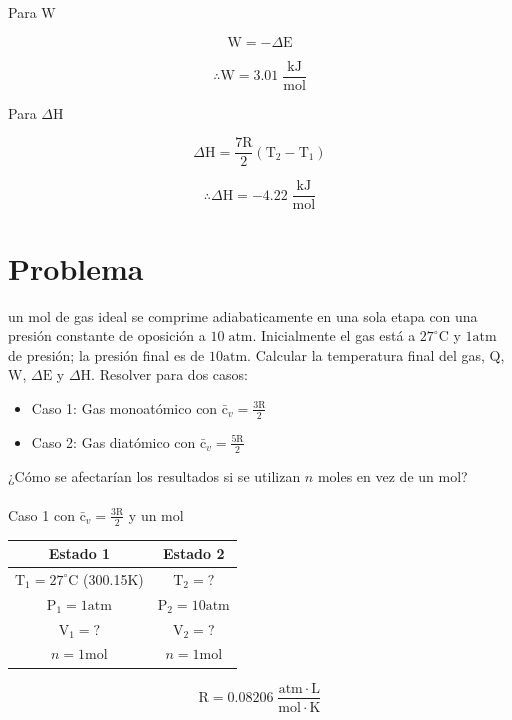 \documentclass[12pt]{article}
\begin{document}
Para $\mathrm{W}$

\begin{displaymath}
	\mathrm{W}=-\Delta\mathrm{E}
\end{displaymath}

\begin{displaymath}
	\therefore\mathrm{W}=3.01\;\frac{\mathrm{kJ}}{\mathrm{mol}}
\end{displaymath}

Para $\Delta\mathrm{H}$

\begin{displaymath}
	\Delta\mathrm{H}=\frac{7\mathrm{R}}{2}(\mathrm{T}_2-\mathrm{T}_1)
\end{displaymath}

\begin{displaymath}
	\therefore\Delta\mathrm{H}=-4.22\;\frac{\mathrm{kJ}}{\mathrm{mol}}
\end{displaymath}
\newpage

\section*{Problema}

un mol de gas ideal se comprime adiabaticamente en una sola etapa con una presión constante de oposición a $10\;\mathrm{atm}$. Inicialmente el gas está a $27^{\circ}\mathrm{C}$ y $1\mathrm{atm}$ de presión; la presión final es de $10\mathrm{atm}$. Calcular la temperatura final del gas, $\mathrm{Q}$, $\mathrm{W}$, $\Delta\mathrm{E}$ y $\Delta\mathrm{H}$. Resolver para dos casos:
\begin{itemize}
	\item Caso 1: Gas monoatómico con $\mathrm{\bar{c}}_v=\frac{3\mathrm{R}}{2}$
	
	\item Caso 2: Gas diatómico con $\mathrm{\bar{c}}_v=\frac{5\mathrm{R}}{2}$
\end{itemize}

¿Cómo se afectarían los resultados si se utilizan $n$ moles en vez de un mol?\\
\\

Caso 1 con $\mathrm{\bar{c}}_v=\frac{3\mathrm{R}}{2}$ y un mol

\begin{center}
	\begin{tabular}{| c | c |}
		\hline
		Estado 1 &    Estado 2 \\ \hline
		$\mathrm{T}_1=27^{\circ}\mathrm{C}$\; (300.15$\mathrm{K}$) &    $\mathrm{T}_2=?$ \\
		$\mathrm{P}_1=1\mathrm{atm}$ &    $\mathrm{P}_2=10\mathrm{atm}$ \\
		$\mathrm{V}_1=?$ &    $\mathrm{V}_2=?$\\
		$n=1\mathrm{mol}$&    $n=1\mathrm{mol}$\\ \hline
	\end{tabular}

\begin{displaymath}
	\mathrm{R}=0.08206\; \frac{\mathrm{atm}\cdot\mathrm{L}}{\mathrm{mol}\cdot\mathrm{K}}
\end{displaymath}
\end{center}
\end{document}

